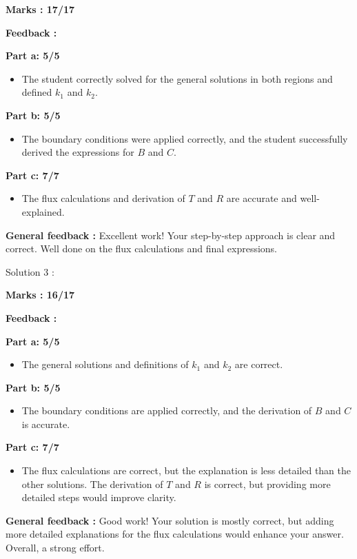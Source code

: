 \documentclass[a4paper,11pt]{article}
\begin{document}
\textbf{Marks : 17/17}

\textbf{Feedback :}

\textbf{Part a: 5/5}
\begin{itemize}
    \item The student correctly solved for the general solutions in both regions and defined $k_1$ and $k_2$.
\end{itemize}


\textbf{Part b: 5/5}
\begin{itemize}
    \item The boundary conditions were applied correctly, and the student successfully derived the expressions for $B$ and $C$.
\end{itemize}

\textbf{Part c: 7/7}
\begin{itemize}
    \item The flux calculations and derivation of $T$ and $R$ are accurate and well-explained.
\end{itemize}


\textbf{General feedback :}
Excellent work! Your step-by-step approach is clear and correct. Well done on the flux calculations and final expressions.



Solution 3 :


\textbf{Marks : 16/17}

\textbf{Feedback :}

\textbf{Part a: 5/5}
\begin{itemize}
    \item The general solutions and definitions of $k_1$ and $k_2$ are correct.
\end{itemize}


\textbf{Part b: 5/5}
\begin{itemize}
    \item The boundary conditions are applied correctly, and the derivation of $B$ and $C$ is accurate.
\end{itemize}

\textbf{Part c: 7/7}
\begin{itemize}
    \item The flux calculations are correct, but the explanation is less detailed than the other solutions. The derivation of $T$ and $R$ is correct, but providing more detailed steps would improve clarity.
\end{itemize}

\textbf{General feedback :}
Good work! Your solution is mostly correct, but adding more detailed explanations for the flux calculations would enhance your answer. Overall, a strong effort.
\end{document}
